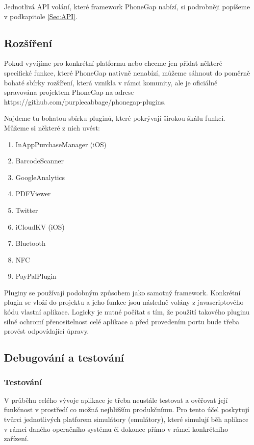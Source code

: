 Jednotlivá API volání, které framework PhoneGap nabízí, si podrobněji popíšeme v podkapitole \ref{Sec:API}.

\subsection{Rozšíření}
Pokud vyvíjíme pro konkrétní platformu nebo chceme jen přidat některé specifické funkce, které PhoneGap nativně nenabízí, můžeme sáhnout do poměrně bohaté sbírky rozšíření, která vznikla v rámci komunity, ale je oficiálně spravována projektem PhoneGap na adrese https://github.com/purplecabbage/phonegap-plugins. %

Najdeme tu bohatou sbírku pluginů, které pokrývají širokou škálu funkcí. Můžeme si některé z nich uvést:

\begin{enumerate}
	\item InAppPurchaseManager (iOS)
	\item BarcodeScanner
	\item GoogleAnalytics
	\item PDFViewer
	\item Twitter
	\item iCloudKV (iOS)
	\item Bluetooth
	\item NFC
	\item PayPalPlugin
\end{enumerate}

Pluginy se používají podobným způsobem jako samotný framework. Konkrétní plugin se vloží do projektu a jeho funkce jsou následně volány z javascriptového kódu vlastní aplikace. Logicky je nutné počítat s tím, že použití takového pluginu silně ochromí přenositelnost celé aplikace a před provedením portu bude třeba provést odpovídající úpravy.

\subsection{Debugování a testování} \label{Sec:DebugaTest}
\subsubsection{Testování}
V průběhu celého vývoje aplikace je třeba neustále testovat a ověřovat její funkčnost v prostředí co možná nejbližším produkčnímu. Pro tento účel poskytují tvůrci jednotlivých platforem simulátory (emulátory), které simulují běh aplikace v rámci daného operačního systému či dokonce přímo v rámci konkrétního zařízení.

